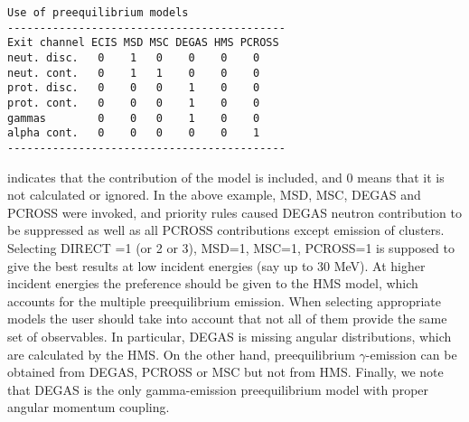 \documentclass[twocolumn,amsmath,amssymb,10pt,groupedaddress,a4paper]{revtex4}
\begin{document}
\begin{verbatim}
Use of preequilibrium models
-------------------------------------------
Exit channel ECIS MSD MSC DEGAS HMS PCROSS
neut. disc.   0    1   0    0    0    0
neut. cont.   0    1   1    0    0    0
prot. disc.   0    0   0    1    0    0
prot. cont.   0    0   0    1    0    0
gammas        0    0   0    1    0    0
alpha cont.   0    0   0    0    0    1
-------------------------------------------
\end{verbatim}

 indicates that the contribution of the model is included,
and 0 means that it is not calculated or ignored. In the above example,
MSD, MSC, DEGAS and PCROSS
were invoked, and priority rules caused DEGAS neutron contribution
to be suppressed as well as all PCROSS contributions except emission
of clusters.
Selecting DIRECT =1 (or 2 or 3), MSD=1, MSC=1, PCROSS=1 is supposed
to give the best results at low incident energies (say up to 30 MeV).
At higher incident energies the preference should be given to the
HMS model, which accounts for the multiple preequilibrium
emission. When selecting appropriate models the user should take into
account that not all of them provide the same set of observables.
In particular, DEGAS is missing angular distributions,
which are calculated by the HMS. On the other hand, preequilibrium
$\gamma$-emission can be obtained from DEGAS, PCROSS or MSC
but not from HMS. Finally, we note that DEGAS is the only gamma-emission
preequilibrium model with proper angular momentum coupling.

\end{document}
